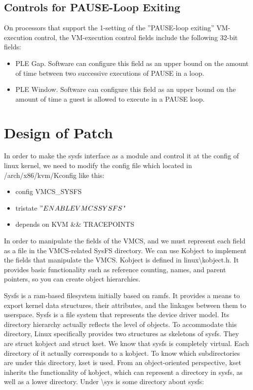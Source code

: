 \documentclass[10pt,draftclsnofoot,journal,compsoc,onecolumn]{IEEEtran}
\begin{document}
	\subsection{Controls for PAUSE-Loop Exiting}
	On processors that support the 1-setting of the ”PAUSE-loop exiting” VM-execution control, the VM-execution control fields include the following 32-bit fields:
	
	\begin{itemize}
		\item PLE Gap. Software can configure this field as an upper bound on the amount of time between two successive executions of PAUSE in a loop.
		\item PLE Window. Software can configure this field as an upper bound on the amount of time a guest is allowed to execute in a PAUSE loop.
	\end{itemize}
	
	\section{Design of Patch}
	In order to make the sysfs interface as a module and control it at the config of linux kernel, we need to modify the config file which located in /arch/x86/kvm/Kconfig like this:
	
	\begin{itemize}
		\item config VMCS\_SYSFS
		\item tristate $"ENABLE VMCS SYSFS$"
		\item depends on KVM \&\& TRACEPOINTS
	\end{itemize}
	
	In order to manipulate the fields of the VMCS, and we must represent each field as a file in the VMCS-related SysFS directory. We can use Kobject to implement the fields that manipulate the VMCS. Kobject is defined in linux\textbackslash kobject.h. It provides basic functionality such as reference counting, names, and parent pointers, so you can create object hierarchies.
	
	Sysfs is a ram-based filesystem initially based on ramfs. It provides a means to export kernel data structures, their attributes, and the linkages between them to userspace. Sysfs is a file system that represents the device driver model. Its directory hierarchy actually reflects the level of objects\cite{3}. To accommodate this directory, Linux specifically provides two structures as skeletons of sysfs. They are struct kobject and struct kset. We know that sysfs is completely virtual. Each directory of it actually corresponds to a kobject. To know which subdirectories are under this directory, kset is used. From an object-oriented perspective, kset inherits the functionality of kobject, which can represent a directory in sysfs, as well as a lower directory. Under \textbackslash sys is some directory about sysfs\cite{3}:
	
\end{document}
